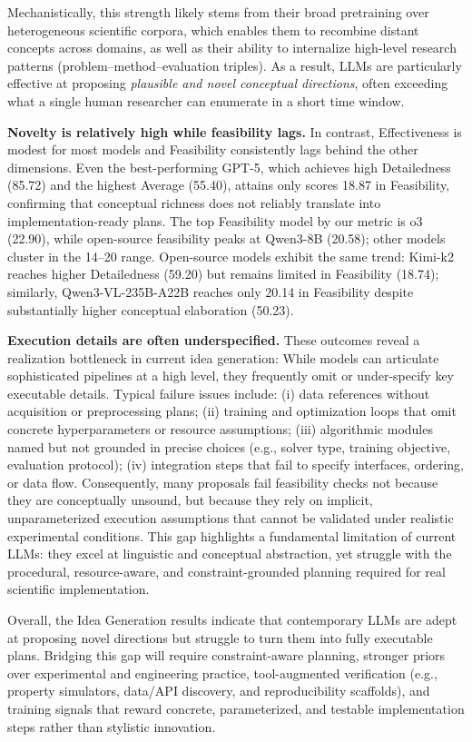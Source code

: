 Mechanistically, this strength likely stems from their broad pretraining over heterogeneous scientific corpora, which enables them to recombine distant concepts across domains, as well as their ability to internalize high-level research patterns (problem--method--evaluation triples). 
As a result, LLMs are particularly effective at proposing \emph{plausible and novel conceptual directions}, often exceeding what a single human researcher can enumerate in a short time window.


\textbf{Novelty is relatively high while feasibility lags.}
In contrast, Effectiveness is modest for most models and Feasibility consistently lags behind the other dimensions. Even the best-performing GPT-5, which achieves high Detailedness (85.72) and the highest Average (55.40), attains only scores 18.87 in Feasibility, confirming that conceptual richness does not reliably translate into implementation-ready plans. The top Feasibility model by our metric is o3 (22.90), while open-source feasibility peaks at Qwen3-8B (20.58); other models cluster in the 14–20 range. Open-source models exhibit the same trend: Kimi-k2 reaches higher Detailedness (59.20) but remains limited in Feasibility (18.74); similarly, Qwen3-VL-235B-A22B reaches only 20.14 in Feasibility despite substantially higher conceptual elaboration (50.23).

\textbf{Execution details are often underspecified.}
These outcomes reveal a realization bottleneck in current idea generation: While models can articulate sophisticated pipelines at a high level, they frequently omit or under-specify key executable details. Typical failure issues include: (i) data references without acquisition or preprocessing plans; (ii) training and optimization loops that omit concrete hyperparameters or resource assumptions; (iii) algorithmic modules named but not grounded in precise choices (e.g., solver type, training objective, evaluation protocol); (iv) integration steps that fail to specify interfaces, ordering, or data flow. Consequently, many proposals fail feasibility checks not because they are conceptually unsound, but because they rely on implicit, unparameterized execution assumptions that cannot be validated under realistic experimental conditions. 
This gap highlights a fundamental limitation of current LLMs: they excel at linguistic and conceptual abstraction, yet struggle with the procedural, resource-aware, and constraint-grounded planning required for real scientific implementation. 

Overall, the Idea Generation results indicate that contemporary LLMs are adept at proposing novel directions but struggle to turn them into fully executable plans. Bridging this gap will require constraint-aware planning, stronger priors over experimental and engineering practice, tool-augmented verification (e.g., property simulators, data/API discovery, and reproducibility scaffolds), and training signals that reward concrete, parameterized, and testable implementation steps rather than stylistic innovation.



